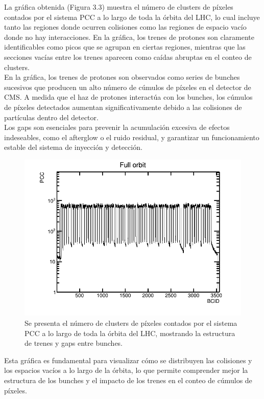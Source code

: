 La gráfica obtenida (Figura 3.3) muestra el número de clusters de píxeles contados por el sistema PCC a lo largo de toda la órbita del LHC, lo cual incluye tanto las regiones donde ocurren colisiones como las regiones de espacio vacío donde no hay interacciones. En la gráfica, los trenes de protones son claramente identificables como picos que se agrupan en ciertas regiones, mientras que las secciones vacías entre los trenes aparecen como caídas abruptas en el conteo de clusters.\\

En la gráfica, los trenes de protones son observados como series de bunches sucesivos que producen un alto número de cúmulos de píxeles en el detector de CMS. A medida que el haz de protones interactúa con los bunches, los cúmulos de píxeles detectados aumentan significativamente debido a las colisiones de partículas dentro del detector.\\

Los gaps son esenciales para prevenir la acumulación excesiva de efectos indeseables, como el afterglow o el ruido residual, y garantizar un funcionamiento estable del sistema de inyección y detección.\\

\begin{center}
  \begin{figure}[h!]
    \centering
    \includegraphics[width=.55\textwidth]{Chapter3/full_orbit_data_only_no_fit.png}
    \caption[Llenado (fill) de una orbita]{Se presenta el número de clusters de píxeles contados por el sistema PCC a lo largo de toda la órbita del LHC, mostrando la estructura de trenes y gaps entre bunches.} 
    \label{Lumi_2022}
  \end{figure}
\end{center}

Esta gráfica es fundamental para visualizar cómo se distribuyen las colisiones y los espacios vacíos a lo largo de la órbita, lo que permite comprender mejor la estructura de los bunches y el impacto de los trenes en el conteo de cúmulos de píxeles.\\

